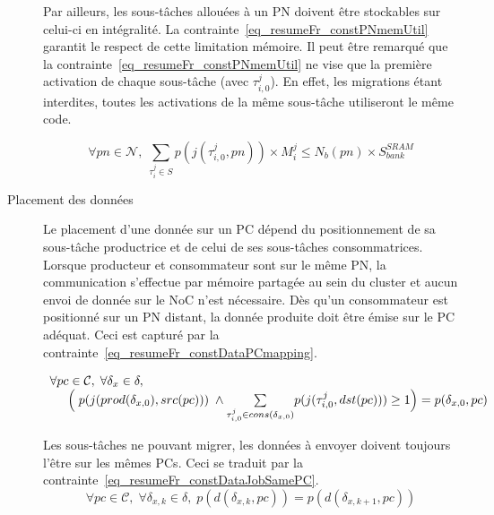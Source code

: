 \documentclass[main.tex]{subfiles}
\begin{document}
\begin{description}
        Par ailleurs, les sous-tâches allouées à un PN doivent être stockables sur celui-ci en intégralité. La contrainte~\ref{eq_resumeFr_constPNmemUtil} garantit le respect de cette limitation mémoire. Il peut être remarqué que la contrainte~\ref{eq_resumeFr_constPNmemUtil} ne vise que la première activation de chaque sous-tâche (avec $\tau_{i,0}^j $). En effet, les migrations étant interdites, toutes les activations de la même sous-tâche utiliseront le même code.

\begin{equation}
    \label{eq_resumeFr_constPNmemUtil}
    \forall pn \in \mathcal{N} , \;
    \underset{ \tau_i^j \in S }{\sum} p( j( \tau_{i,0}^j , pn ) ) \times M_i^j \leq N_b(pn) \times S_{bank}^{SRAM}
\end{equation}


    \item[Placement des données]
        Le placement d'une donnée sur un PC dépend du positionnement de sa sous-tâche productrice et de celui de ses sous-tâches consommatrices. Lorsque producteur et consommateur sont sur le même PN, la communication s'effectue par mémoire partagée au sein du cluster et aucun envoi de donnée sur le NoC n'est nécessaire. Dès qu'un consommateur est positionné sur un PN distant, la donnée produite doit être émise sur le PC adéquat. Ceci est capturé par la contrainte~\ref{eq_resumeFr_constDataPCmapping}.

\begin{equation}
    \label{eq_resumeFr_constDataPCmapping}
    \begin{array}{l}
        \forall pc \in \mathcal{C}, \; \forall \delta_{x} \in \delta,  \\
        \hspace{5mm} \Big( \; p(j(prod(\delta_{x,0}), src(pc))) \; \land \underset{\tau_{i,0}^j \in cons(\delta_{x,0})}{\sum} p(j(\tau_{i,0}^j , dst(pc))) \geq 1   \Big)  = p( \delta_{x,0} , pc  ) 
    \end{array}
\end{equation}
        
        Les sous-tâches ne pouvant migrer, les données à envoyer doivent toujours l'être sur les mêmes PCs. Ceci se traduit par la contrainte~\ref{eq_resumeFr_constDataJobSamePC}.
\begin{equation}
    \label{eq_resumeFr_constDataJobSamePC}
    \forall pc \in \mathcal{C}, \; \forall \delta_{x,k} \in \delta, \; 
    p( d( \delta_{x,k} , pc ) ) = p( d( \delta_{x,k+1} , pc ) )
\end{equation}
        

\end{description}
\end{document}
